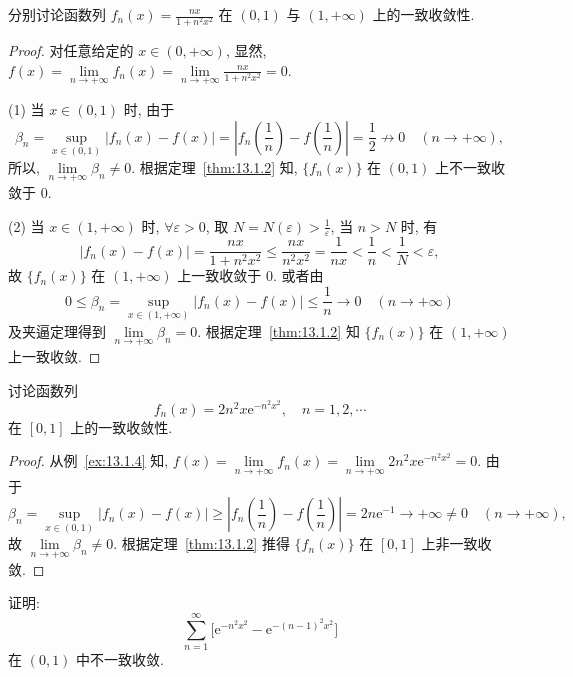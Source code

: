 \begin{example}\label{ex:13.1.10}
分别讨论函数列 $f_{n}(x)=\frac{nx}{1+n^{2}x^{2}}$ 在 $(0,1)$ 与 $(1,+\infty)$ 上的一致收敛性.
\end{example}

\begin{proof}
对任意给定的 $x\in(0,+\infty)$, 显然, $f(x)=\lim\limits_{n\to+\infty}f_{n}(x)=\lim\limits_{n\to+\infty}\frac{nx}{1+n^{2}x^{2}}=0$.

(1) 当 $x\in(0,1)$ 时, 由于
\[
  \beta_{n}=\sup_{x\in(0,1)}|f_{n}(x)-f(x)|=\left|f_{n}\left(\frac{1}{n}\right)-f\left(\frac{1}{n}\right)\right|=\frac{1}{2}\not\to0\quad(n\to+\infty),
\]
所以, $\lim\limits_{n\to+\infty}\beta_{n}\neq0$. 根据定理~\ref{thm:13.1.2} 知, $\{f_{n}(x)\}$ 在 $(0,1)$ 上不一致收敛于 $0$.

(2) 当 $x\in(1,+\infty)$ 时, $\forall\varepsilon>0$, 取 $N=N(\varepsilon)>\frac{1}{\varepsilon}$, 当 $n>N$ 时, 有
\[
  |f_{n}(x)-f(x)|=\frac{nx}{1+n^{2}x^{2}}\leqslant\frac{nx}{n^{2}x^{2}}=\frac{1}{nx}<\frac{1}{n}<\frac{1}{N}<\varepsilon,
\]
故 $\{f_{n}(x)\}$ 在 $(1,+\infty)$ 上一致收敛于 $0$. 或者由
\[
  0\leqslant\beta_{n}=\sup_{x\in(1,+\infty)}|f_{n}(x)-f(x)|\leqslant\frac{1}{n}\to0\quad(n\to+\infty)
\]
及夹逼定理得到 $\lim\limits_{n\to+\infty}\beta_{n}=0$. 根据定理~\ref{thm:13.1.2} 知 $\{f_{n}(x)\}$ 在 $(1,+\infty)$ 上一致收敛.
\end{proof}

\begin{example}\label{ex:13.1.11}
讨论函数列
\[
  f_{n}(x)=2n^{2}x\mathrm{e}^{-n^{2}x^{2}},\quad n=1,2,\cdots
\]
在 $[0,1]$ 上的一致收敛性.
\end{example}

\begin{proof}
从例~\ref{ex:13.1.4} 知, $f(x)=\lim\limits_{n\to+\infty}f_{n}(x)=\lim\limits_{n\to+\infty}2n^{2}x\mathrm{e}^{-n^{2}x^{2}}=0$. 由于
\[
  \beta_{n}=\sup_{x\in(0,1)}|f_{n}(x)-f(x)|\geqslant\left|f_{n}\left(\frac{1}{n}\right)-f\left(\frac{1}{n}\right)\right|=2n\mathrm{e}^{-1}\to+\infty\neq0\quad(n\to+\infty),
\]
故 $\lim\limits_{n\to+\infty}\beta_{n}\neq0$. 根据定理~\ref{thm:13.1.2} 推得 $\{f_{n}(x)\}$ 在 $[0,1]$ 上非一致收敛.
\end{proof}

\begin{example}\label{ex:13.1.12}
证明:
\[
  \sum_{n=1}^{\infty}\bigl[\mathrm{e}^{-n^{2}x^{2}}-\mathrm{e}^{-(n-1)^{2}x^{2}}\bigr]
\]
在 $(0,1)$ 中不一致收敛.
\end{example}

